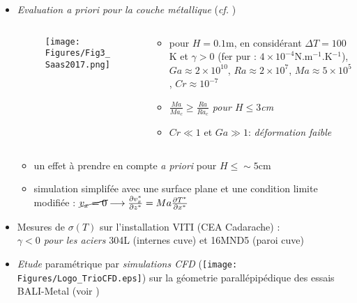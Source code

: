 \begin{frame}[fragile]
\begin{itemize}
\item \emph{Evaluation \textit{a priori} pour la couche métallique} (\textit{cf.} \cite{Saas2017})
\begin{columns}[T]
    \begin{column}{0.4\textwidth}
\begin{figure}[H]
\centering \texttt{[image: Figures/Fig3\_Saas2017.png]} \\
\end{figure}
    \end{column}
    \begin{column}{0.6\textwidth}
    \begin{itemize}
\item pour $H=0.1$m, en considérant $\Delta T = 100$K et \emph{$\gamma>0$} (fer pur : $4\times 10^{-4}$N.m$^{-1}$.K$^{-1}$), \\
$Ga\approx 2\times 10^{10}$, $Ra\approx 2\times 10^{7}$, $Ma\approx 5\times 10^{5}$, $Cr\approx 10^{-7}$
\item \emph{$\frac{Ma}{Ma_c}\ge\frac{Ra}{Ra_c}$ pour $H\le 3$cm}
\item $Cr\ll 1$ et $Ga\gg 1$: \emph{déformation faible}
\end{itemize}
    \end{column}
    \end{columns}
    \begin{itemize}
    \item un effet à prendre en compte \textit{a priori} pour $H \le \sim 5$cm
    \item simulation simplifée avec une surface plane et une condition limite modifiée : $\cancel{v_x=0} \longrightarrow \frac{\partial v_x^\ast}{\partial z^\ast} = Ma \frac{\partial T^\ast}{\partial x^\ast}$
    \end{itemize}
\item Mesures de $\sigma(T)$ sur l'installation VITI (CEA Cadarache) \cite{Chikhi2019} : \\ \emph{$\gamma<0$ pour les aciers} 304L (internes cuve) et 16MND5 (paroi cuve)
\item \emph{Etude} paramétrique par \emph{simulations CFD} (\texttt{[image: Figures/Logo\_TrioCFD.eps]}) sur la géometrie parallépipédique des essais BALI-Metal (voir \cite{Peybernes2019})
\end{itemize}
\end{frame}
